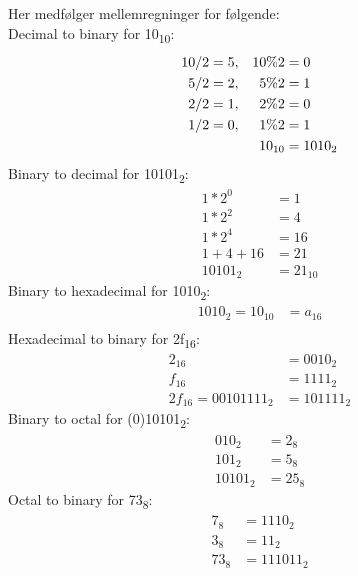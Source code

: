 \documentclass[12pt,a4paper]{article}
\begin{document}
Her medfølger mellemregninger for følgende:\\
\noindent Decimal to binary for 10\textsubscript{10}: 
\begin{align}
\centering
10/2 = 5, && 10\%2 &= 0 \\
5/2 = 2, && 5\%2 &= 1 \\
2/2 = 1, && 2\%2 &= 0 \\
1/2 = 0, && 1\%2 &= 1 \\
&& 10_{10}&= 1010_{2}
\end{align}
\noindent Binary to decimal for 10101\textsubscript{2}: 
\begin{align}
1*2^0&=1\\
1*2^2&=4\\
1*2^4&=16 \\
1+4+16&=21 \\
10101_{2} &= 21_{10}
\end{align}
\noindent Binary to hexadecimal for 1010\textsubscript{2}: 
\begin{align}
1010_{2}=10_{10}&=a_{16}\\
\end{align}
\noindent Hexadecimal to binary for 2f\textsubscript{16}: 
\begin{align}
2_{16}&=0010_{2}\\
f_{16}&=1111_{2}\\
2f_{16} = 00101111_{2}&= 101111_{2}
\end{align}
\noindent Binary to octal for (0)10101\textsubscript{2}: 
\begin{align}
010_{2}&=2_{8}\\
101_{2}&=5_{8}\\
10101_{2} &= 25_{8}
\end{align}
\noindent Octal to binary for 73\textsubscript{8}: 
\begin{align}
7_{8}&=1110_{2}\\
3_{8}&=11_{2}\\
73_{8}&= 111011_{2}
\end{align}
\end{document}
